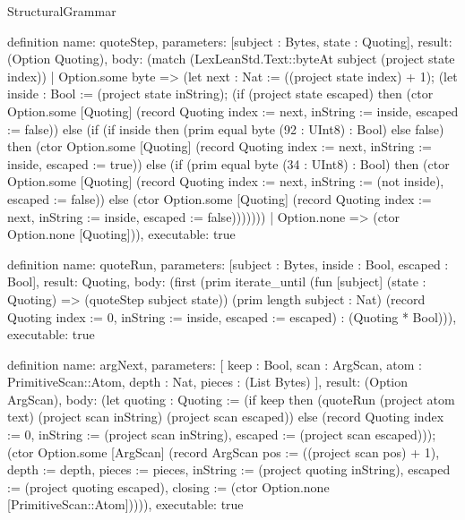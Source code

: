 \begin{lexlean}{StructuralGrammar}
\begin{semanticmodule}
definition{
  name: quoteStep,
  parameters: [subject : Bytes, state : Quoting],
  result: (Option Quoting),
  body: (match (LexLeanStd.Text::byteAt subject (project state index))
    | Option.some byte => (let next : Nat := ((project state index) + 1); (let inside : Bool := (project state inString); (if (project state escaped) then (ctor Option.some [Quoting] (record Quoting {index := next, inString := inside, escaped := false})) else (if (if inside then (prim equal byte (92 : UInt8) : Bool) else false) then (ctor Option.some [Quoting] (record Quoting {index := next, inString := inside, escaped := true})) else (if (prim equal byte (34 : UInt8) : Bool) then (ctor Option.some [Quoting] (record Quoting {index := next, inString := (not inside), escaped := false})) else (ctor Option.some [Quoting] (record Quoting {index := next, inString := inside, escaped := false})))))))
    | Option.none => (ctor Option.none [Quoting])),
  executable: true
}

definition{
  name: quoteRun,
  parameters: [subject : Bytes, inside : Bool, escaped : Bool],
  result: Quoting,
  body: (first (prim iterate_until (fun [subject] (state : Quoting) => (quoteStep subject state)) (prim length subject : Nat) (record Quoting {index := 0, inString := inside, escaped := escaped}) : (Quoting * Bool))),
  executable: true
}

definition{
  name: argNext,
  parameters: [
    keep : Bool,
    scan : ArgScan,
    atom : PrimitiveScan::Atom,
    depth : Nat,
    pieces : (List Bytes)
  ],
  result: (Option ArgScan),
  body: (let quoting : Quoting := (if keep then (quoteRun (project atom text) (project scan inString) (project scan escaped)) else (record Quoting {index := 0, inString := (project scan inString), escaped := (project scan escaped)})); (ctor Option.some [ArgScan] (record ArgScan {pos := ((project scan pos) + 1), depth := depth, pieces := pieces, inString := (project quoting inString), escaped := (project quoting escaped), closing := (ctor Option.none [PrimitiveScan::Atom])}))),
  executable: true
}


\end{semanticmodule}
\end{lexlean}
